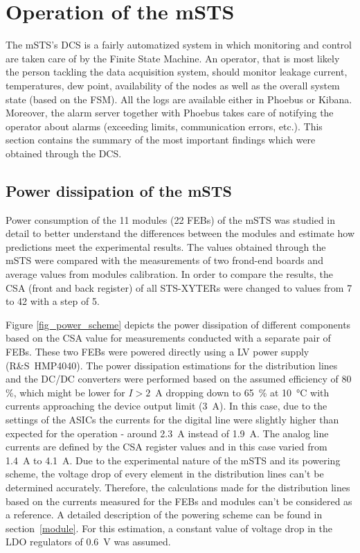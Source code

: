 \section{Operation of the mSTS}

The \gls{mSTS}'s \gls{DCS} is a fairly automatized system in which monitoring and control are taken care of by the Finite State Machine. An operator, that is most likely the person tackling the data acquisition system, should monitor leakage current, temperatures, dew point, availability of the nodes as well as the overall system state (based on the \gls{FSM}). All the logs are available either in Phoebus or Kibana. Moreover, the alarm server together with Phoebus takes care of notifying the operator about alarms (exceeding limits, communication errors, etc.). This section contains the summary of the most important findings which were obtained through the \gls{DCS}. 
\subsection{Power dissipation of the mSTS}
 Power consumption of the 11 modules (22 \glspl{FEB}) of the \gls{mSTS} was studied in detail to better understand the differences between the modules and estimate how predictions meet the experimental results. The values obtained through the \gls{mSTS} were compared with the measurements of two frond-end boards and average values from modules calibration. In order to compare the results, the \gls{CSA} (front and back register) of all STS-XYTERs were changed to values from 7 to 42 with a step of 5.
 
 Figure \ref{fig_power_scheme} depicts the power dissipation of different components based on the \gls{CSA} value for measurements conducted with a separate pair of \gls{FEB}s. These two \glspl{FEB} were powered directly using a \gls{LV} power supply (R\&S~HMP4040). The power dissipation estimations for the distribution lines and the DC/DC converters were performed based on the assumed efficiency of 80 \%, which might be lower for $I > 2$~A dropping down to 65~\% at \SI{10}{\celsius} with currents approaching the device output limit (3~A). In this case, due to the settings of the \glspl{ASIC} the currents for the digital line were slightly higher than expected for the operation - around 2.3~A instead of 1.9~A. The analog line currents are defined by the \gls{CSA} register values and in this case varied from 1.4~A to 4.1~A.  Due to the experimental nature of the \gls{mSTS} and its powering scheme, the voltage drop of every element in the distribution lines can't be determined accurately. Therefore, the calculations made for the distribution lines based on the currents measured for the \glspl{FEB} and modules can't be considered as a reference. A detailed description of the powering scheme can be found in section~\ref{module}.  For this estimation, a constant value of voltage drop in the \gls{LDO} regulators of 0.6~V was assumed. 

